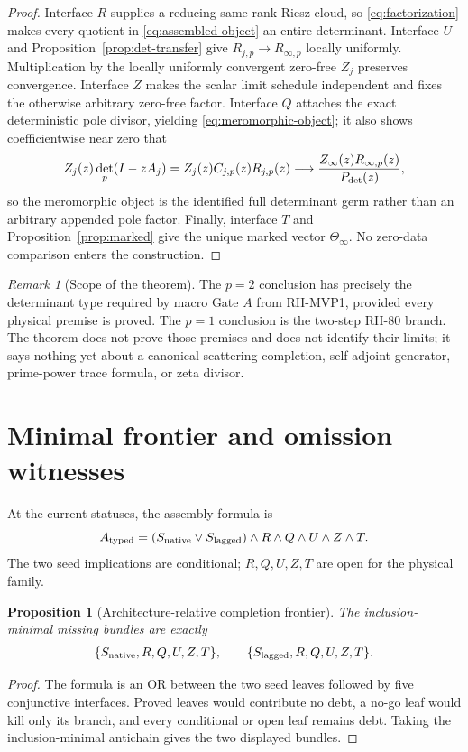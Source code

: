 \documentclass[11pt]{article}
\newtheorem{proposition}[theorem]{Proposition}
\theoremstyle{definition}
\theoremstyle{remark}
\newtheorem{remark}[theorem]{Remark}
\begin{document}
\begin{proof}
Interface $R$ supplies a reducing same-rank Riesz cloud, so
\eqref{eq:factorization} makes every quotient in
\eqref{eq:assembled-object} an entire determinant.  Interface $U$ and
Proposition~\ref{prop:det-transfer} give
$R_{j,p}\to R_{\infty,p}$ locally uniformly.
Multiplication by the locally uniformly convergent zero-free $Z_j$ preserves
convergence.  Interface $Z$ makes the scalar limit schedule independent and
fixes
the otherwise arbitrary zero-free factor.  Interface $Q$ attaches the exact
deterministic pole divisor, yielding \eqref{eq:meromorphic-object}; it also
shows coefficientwise near zero that
\[
 Z_j(z)\det_p(I-zA_j)=Z_j(z)C_{j,p}(z)R_{j,p}(z)
 \longrightarrow \frac{Z_\infty(z)R_{\infty,p}(z)}{P_{\rm det}(z)},
\]
so the meromorphic object is the identified full determinant germ rather than
an arbitrary appended pole factor.  Finally,
interface $T$ and Proposition~\ref{prop:marked} give the unique marked vector
$\Theta_\infty$.  No zero-data comparison enters the construction.
\end{proof}

\begin{remark}[Scope of the theorem]
The $p=2$ conclusion has precisely the determinant type required by macro
Gate $A$ from RH-MVP1, provided every physical premise is proved.  The
$p=1$ conclusion is the two-step RH-80 branch.  The theorem does not prove
those premises and does not identify their limits; it says nothing yet
about a canonical scattering completion, self-adjoint generator, prime-power
trace formula, or zeta divisor.
\end{remark}

\section{Minimal frontier and omission witnesses}

At the current statuses, the assembly formula is
\[
 A_{\rm typed}
 =(S_{\rm native}\vee S_{\rm lagged})\wedge R\wedge Q\wedge U\wedge Z\wedge T.
\]
The two seed implications are conditional; $R,Q,U,Z,T$ are open for the
physical family.

\begin{proposition}[Architecture-relative completion frontier]
The inclusion-minimal missing bundles are exactly
\begin{align*}
 \{S_{\rm native},R,Q,U,Z,T\},\qquad
 \{S_{\rm lagged},R,Q,U,Z,T\}.
\end{align*}
\end{proposition}
\begin{proof}
The formula is an OR between the two seed leaves followed by five conjunctive
interfaces.  Proved leaves would contribute no debt, a no-go leaf would kill
only its branch, and every conditional or open leaf remains debt.  Taking the
inclusion-minimal antichain gives the two displayed bundles.
\end{proof}
\end{document}
